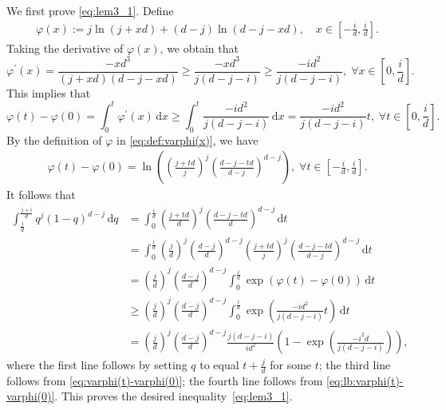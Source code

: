 \documentclass[onecolumn,letterpaper]{IEEEtran}
\newcommand{\cp}{{q}}
\newcommand*{\dif}{{\,\mathrm{d}}}
\newcommand{\gm}{{\varphi}}
\newcommand{\qp}{{t}}
\begin{document}
\begin{IEEEproof}
We first prove \eqref{eq:lem3_1}. Define 
\begin{align}
\label{eq:def:varphi(x)}
 \gm(x) := j\ln(j+xd)+(d-j)\ln(d-j-xd), \quad x \in \left[-\frac { i }{d},\frac { i }{d}\right].   
\end{align}  
Taking the derivative of $\gm(x)$, we obtain that  
\begin{equation*}
\gm^\prime (x) = \frac{-x d^3 }{(j+xd)(d-j-xd)} \geq \frac{-x d^3 }{j(d-j- i )}\geq\frac{- i d^2  }{j(d-j- i )},\;\forall x \in \left[0,\frac { i }{d}\right].
\end{equation*}
This implies that 
\begin{equation}
\label{eq:lb:varphi(t)-varphi(0)}
\gm(\qp)-\gm(0) = \int_0^\qp \gm^\prime (x) \dif x \geq \int_0^\qp \frac{- i d^2 }{j(d-j- i )} \dif x = \frac{-  i d^2}{j(d-j- i )} \qp,\; \forall\qp \in \left[0,\frac  i  d\right]. 
\end{equation}
By the definition of $\gm$ in \eqref{eq:def:varphi(x)}, we have
\begin{align}
\label{eq:varphi(t)-varphi(0)}
\gm(\qp)-\gm(0)=\ln\left( \left( \frac{j+\qp d}{j} \right)^j \left( \frac{d-j-\qp d}{d-j} \right)^{d-j}\right),\;\forall  \qp \in \left[-\frac  i  d,\frac  i  d\right].
\end{align}
It follows that 
\begin{align*}
\int_{\frac {j}{d}}^{\frac {j+ i }{d}} \cp^j (1-\cp)^{d-j} \dif \cp &= \int_0^{\frac { i } {d}} \left( \frac{j+\qp d}{d} \right)^j \left( \frac{d-j-\qp d}{d} \right)^{d-j} \dif \qp \\ 
&= \int_0^{\frac { i } {d}} \left( \frac{j}{d} \right)^j \left( \frac{d-j}{d} \right)^{d-j}  \left( \frac{j+\qp d}{j} \right)^j \left( \frac{d-j-\qp d}{d-j} \right)^{d-j} \dif \qp \\ 
&= \left( \frac{j}{d} \right)^j \left( \frac{d-j}{d} \right)^{d-j}  \int_0^{\frac { i } {d}} \exp(\gm(\qp) - \gm(0)) \dif \qp \\ 
&\ge \left( \frac{j}{d} \right)^j \left( \frac{d-j}{d} \right)^{d-j}  \int_0^{\frac { i } {d}} \exp\left(\frac{- i d^2 }{j(d-j- i )} \qp\right) \dif \qp \\ 
&= \left( \frac{j}{d} \right)^j \left( \frac{d-j}{d} \right)^{d-j} \frac{j(d-j- i )}{ i d^2} \left( 1 - \exp\left( \frac{- i ^2 d }{j (d-j- i )} \right) \right),
\end{align*}
where the first line follows by setting $q$ to equal $t+\frac{j}{d}$ for some $t$; the third line follows from \eqref{eq:varphi(t)-varphi(0)}; the fourth line follows from \eqref{eq:lb:varphi(t)-varphi(0)}.
This proves the desired inequality~\eqref{eq:lem3_1}.


\end{IEEEproof}
\end{document}
